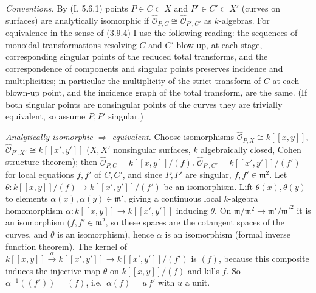 \documentclass[11pt]{article}
\begin{document}
\pf
\emph{Conventions.} By (I, 5.6.1) points $P\in C\subset X$ and $P'\in C'\subset X'$ (curves on surfaces) are analytically isomorphic if $\widehat{\mathcal O}_{P,C}\cong\widehat{\mathcal O}_{P',C'}$ as $k$-algebras. For equivalence in the sense of (3.9.4) I use the following reading: the sequences of monoidal transformations resolving $C$ and $C'$ blow up, at each stage, corresponding singular points of the reduced total transforms, and the correspondence of components and singular points preserves incidence and multiplicities; in particular the multiplicity of the strict transform of $C$ at each blown-up point, and the incidence graph of the total transform, are the same. (If both singular points are nonsingular points of the curves they are trivially equivalent, so assume $P,P'$ singular.)

\emph{Analytically isomorphic $\Rightarrow$ equivalent.} Choose isomorphisms $\widehat{\mathcal O}_{P,X}\cong k[[x,y]]$, $\widehat{\mathcal O}_{P',X'}\cong k[[x',y']]$ ($X,X'$ nonsingular surfaces, $k$ algebraically closed, Cohen structure theorem); then $\widehat{\mathcal O}_{P,C}=k[[x,y]]/(f)$, $\widehat{\mathcal O}_{P',C'}=k[[x',y']]/(f')$ for local equations $f,f'$ of $C,C'$, and since $P,P'$ are singular, $f,f'\in\mathfrak m^2$. Let $\theta:k[[x,y]]/(f)\to k[[x',y']]/(f')$ be an isomorphism. Lift $\theta(\bar x),\theta(\bar y)$ to elements $\alpha(x),\alpha(y)\in\mathfrak m'$, giving a continuous local $k$-algebra homomorphism $\alpha:k[[x,y]]\to k[[x',y']]$ inducing $\theta$. On $\mathfrak m/\mathfrak m^2\to\mathfrak m'/\mathfrak m'^2$ it is an isomorphism ($f,f'\in\mathfrak m^2$, so these spaces are the cotangent spaces of the curves, and $\theta$ is an isomorphism), hence $\alpha$ is an isomorphism (formal inverse function theorem). The kernel of $k[[x,y]]\xrightarrow{\alpha}k[[x',y']]\to k[[x',y']]/(f')$ is $(f)$, because this composite induces the injective map $\theta$ on $k[[x,y]]/(f)$ and kills $f$. So $\alpha^{-1}((f'))=(f)$, i.e.\ $\alpha(f)=u\,f'$ with $u$ a unit.
\end{document}
